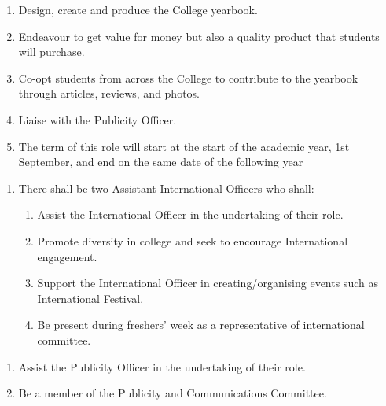 \begin{enumerate}
    \item Design, create and produce the College yearbook.
    \item Endeavour to get value for money but also a quality product that students will purchase.
    \item Co-opt students from across the College to contribute to the yearbook through articles, reviews, and photos.
    \item Liaise with the Publicity Officer.
    \item The term of this role will start at the start of the academic year, 1st September, and end on the same date of the following year
    
\end{enumerate}

\begin{enumerate}
    \item There shall be two Assistant International Officers who shall:
    \begin{enumerate}
        \item Assist the International Officer in the undertaking of their role.
        \item Promote diversity in college and seek to encourage International engagement.
        \item Support the International Officer in creating/organising events such as International Festival.
        \item Be present during freshers’ week as a representative of international committee. 
    \end{enumerate}
\end{enumerate}

\begin{enumerate}
    \item Assist the Publicity Officer in the undertaking of their role. 
    \item Be a member of the Publicity and Communications Committee.
\end{enumerate}

